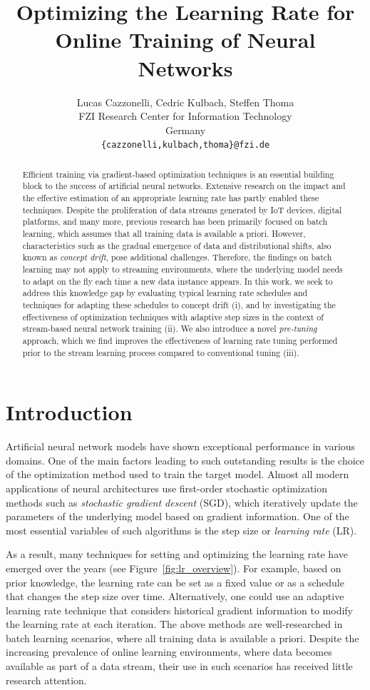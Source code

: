 \documentclass{article} %
\title{Optimizing the Learning Rate for Online Training of Neural Networks}
\author{Lucas Cazzonelli, Cedric Kulbach, Steffen Thoma\\
FZI Research Center for Information Technology\\
Germany \\
\texttt{\{cazzonelli,kulbach,thoma\}@fzi.de} \\
}
\begin{document}
\maketitle

\begin{abstract}
Efficient training via gradient-based optimization techniques is an essential building block to the success of artificial neural networks. Extensive research on the impact and the effective estimation of an appropriate learning rate has partly enabled these techniques. Despite the proliferation of data streams generated by IoT devices, digital platforms, and many more, previous research has been primarily focused on batch learning, which assumes that all training data is available a priori. However, characteristics such as the gradual emergence of data and distributional shifts, also known as \textit{concept drift}, pose additional challenges. Therefore, the findings on batch learning may not apply to streaming environments, where the underlying model needs to adapt on the fly each time a new data instance appears. In this work, we seek to address this knowledge gap by evaluating typical learning rate schedules and techniques for adapting these schedules to concept drift (i), and by investigating the effectiveness of  optimization techniques with adaptive step sizes in the context of stream-based neural network training (ii). We also introduce a novel \textit{pre-tuning} approach, which we find improves the effectiveness of learning rate tuning performed prior to the stream learning process compared to conventional tuning (iii).
\end{abstract}

\section{Introduction}
Artificial neural network models have shown exceptional performance in various domains.
One of the main factors leading to such outstanding results is the choice of the optimization method used to train the target model.
Almost all modern applications of neural architectures use first-order stochastic optimization methods such as \textit{stochastic gradient descent} (SGD), which iteratively update the parameters of the underlying model based on gradient information.
One of the most essential variables of such algorithms is the step size or \textit{learning rate} (LR).

As a result, many techniques for setting and optimizing the learning rate have emerged over the years (see Figure~\ref{fig:lr_overview}).
For example, based on prior knowledge, the learning rate can be set as a fixed value or as a schedule that changes the step size over time.
Alternatively, one could use an adaptive learning rate technique that considers historical gradient information to modify the learning rate at each iteration.
The above methods are well-researched in batch learning scenarios, where all training data is available a priori.
Despite the increasing prevalence of online learning environments, where data becomes available as part of a data stream, their use in such scenarios has received little research attention.
\end{document}
